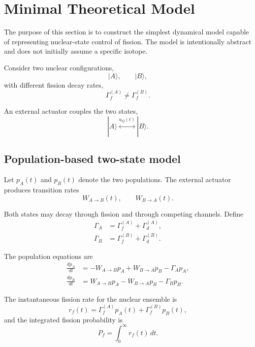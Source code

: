 \section{Minimal Theoretical Model}
\label{sec:minimal_model}

The purpose of this section is to construct the simplest dynamical model capable of representing nuclear-state control of fission. The model is intentionally abstract and does not initially assume a specific isotope.

Consider two nuclear configurations,
\begin{equation}
|A\rangle,
\qquad
|B\rangle,
\end{equation}
with different fission decay rates,
\begin{equation}
\Gamma_f^{(A)}
\neq
\Gamma_f^{(B)}.
\end{equation}

An external actuator couples the two states,
\begin{equation}
|A\rangle
\overset{u_Q(t)}{\longleftrightarrow}
|B\rangle.
\end{equation}

\subsection{Population-based two-state model}

Let $p_A(t)$ and $p_B(t)$ denote the two populations. The external actuator produces transition rates
\begin{equation}
W_{A\rightarrow B}(t),
\qquad
W_{B\rightarrow A}(t).
\end{equation}

Both states may decay through fission and through competing channels. Define
\begin{align}
\Gamma_A &= \Gamma_f^{(A)}+\Gamma_d^{(A)},\\
\Gamma_B &= \Gamma_f^{(B)}+\Gamma_d^{(B)}.
\end{align}

The population equations are
\begin{align}
\frac{dp_A}{dt}
&=
-
W_{A\rightarrow B}p_A
+
W_{B\rightarrow A}p_B
-
\Gamma_Ap_A,
\\
\frac{dp_B}{dt}
&=
W_{A\rightarrow B}p_A
-
W_{B\rightarrow A}p_B
-
\Gamma_Bp_B.
\end{align}

The instantaneous fission rate for the nuclear ensemble is
\begin{equation}
r_f(t)
=
\Gamma_f^{(A)}p_A(t)
+
\Gamma_f^{(B)}p_B(t),
\end{equation}
and the integrated fission probability is
\begin{equation}
P_f
=
\int_0^\infty r_f(t)\,dt.
\end{equation}

